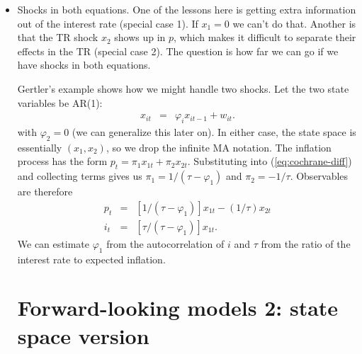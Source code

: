 \documentclass[11pt]{article}
\begin{document}
{\begin{itemize}
\item Shocks in both equations.
One of the lessons here is getting extra information out of the
interest rate (special case 1).
If $x_1 = 0$ we can't do that.
Another is that the TR shock $x_2$ shows up in $p$,
which makes it difficult to separate their effects in the TR
(special case 2).
The question is how far we can go if we have shocks
in both equations.

Gertler's example shows how we might handle two shocks.
Let the two state variables be AR(1):
\begin{eqnarray*}
    x_{it} &=& \varphi_i x_{it-1} + w_{it}  .
\end{eqnarray*}
with  $\varphi_2 = 0$
(we can generalize this later on).
In either case, the state space is essentially $ (x_1,x_2)$,
so we  drop the infinite MA notation.
The inflation process has the form
$ p_t = \pi_1 x_{1t} + \pi_2 x_{2t} $.
Substituting into (\ref{eq:cochrane-diff}) and collecting terms gives us
$ \pi_1 = 1/(\tau-\varphi_1) $ and $ \pi_2 = -1/\tau $.
Observables are therefore
\begin{eqnarray*}
    p_t  &=& [1/(\tau-\varphi_1)] x_{1t}- (1/\tau) x_{2t}  \\
        i_t &=& [\tau/(\tau-\varphi_1)] x_{1t} .
\end{eqnarray*}
We can estimate $\varphi_1$ from the autocorrelation of $i$
and $\tau$ from the ratio of the interest rate to expected inflation.



\section{Forward-looking models 2:  state space version}


\end{itemize}}
\end{document}
